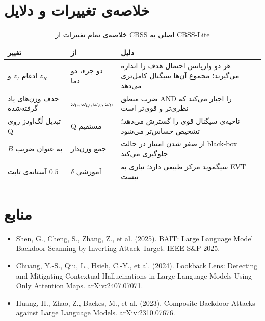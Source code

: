 \documentclass[12pt, a4paper]{article}
\newcommand{\en}[1]{\textenglish{#1}}
\newcommand{\param}[1]{\textcolor{accent}{\texttt{#1}}}
\begin{document}
\section{خلاصه‌ی تغییرات و دلایل}

\begin{table}[H]
\centering
\small
\begin{tabularx}{\textwidth}{@{} >{\raggedleft\arraybackslash}p{3.2cm} >{\raggedleft\arraybackslash}p{2.8cm} X @{}}
\toprule
\textbf{تغییر} & \textbf{از} & \textbf{دلیل} \\
\midrule
ادغام \param{$z_I$} و \param{$z_R$} & دو جزء، دو دما & هر دو واریانس احتمال هدف را اندازه می‌گیرند؛ مجموع آن‌ها سیگنال کامل‌تری می‌دهد \\[4pt]
حذف وزن‌های یاد گرفته‌شده & \param{$\omega_0, \omega_Q, \omega_E, \omega_U$} & ضرب منطق \en{AND} را اجبار می‌کند که نظری‌تر و قوی‌تر است \\[4pt]
تبدیل لُگ‌اودز روی \en{Q} & \en{Q} مستقیم & ناحیه‌ی سیگنال قوی را گسترش می‌دهد؛ تشخیص حساس‌تر می‌شود \\[4pt]
\param{$B$} به عنوان ضریب & جمع وزن‌دار & از صفر شدن امتیاز در حالت \en{black-box} جلوگیری می‌کند \\[4pt]
آستانه‌ی ثابت \param{$0.5$} & \param{$\delta$} آموزشی & سیگموید مرکز طبیعی دارد؛ نیازی به \en{EVT} نیست \\
\bottomrule
\end{tabularx}
\caption{خلاصه‌ی تمام تغییرات از \en{CBSS} اصلی به \en{CBSS-Lite}}
\end{table}

\section{منابع}

\begin{itemize}[leftmargin=*]
  \item \en{Shen, G., Cheng, S., Zhang, Z., et al. (2025). BAIT: Large Language Model Backdoor Scanning by Inverting Attack Target. IEEE S\&P 2025.}
  \item \en{Chuang, Y.-S., Qiu, L., Hsieh, C.-Y., et al. (2024). Lookback Lens: Detecting and Mitigating Contextual Hallucinations in Large Language Models Using Only Attention Maps. arXiv:2407.07071.}
  \item \en{Huang, H., Zhao, Z., Backes, M., et al. (2023). Composite Backdoor Attacks against Large Language Models. arXiv:2310.07676.}
\end{itemize}
\end{document}
